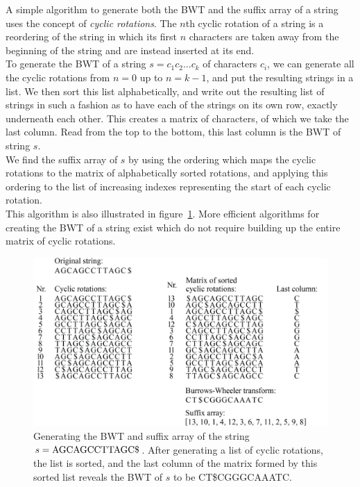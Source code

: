 \documentclass[a4paper,12pt,twoside,BCOR=10mm]{scrbook}
\begin{document}
A simple algorithm to generate both the BWT and the suffix array of a string uses
the concept of \textit{cyclic rotations}.
The $ n $th cyclic rotation of a string is a reordering of the string in which its first $ n $ characters
are taken away from the beginning of the string and are instead inserted at its end. \\
To generate the BWT of a string $ s = c_1 c_2 ... c_k $ of characters $ c_i $,
we can generate all the cyclic rotations from $ n = 0 $ up to $ n = k - 1 $, and
put the resulting strings in a list.
We then sort this list alphabetically, and write out the resulting list of strings
in such a fashion as to have each of the strings on its own row, exactly underneath each other.
This creates a matrix of characters, of which we take the last column.
Read from the top to the bottom, this last column is the BWT of string $ s $. \\
We find the suffix array of $ s $ by using the ordering which maps
the cyclic rotations to the matrix of alphabetically sorted rotations,
and applying this ordering to the list of increasing indexes representing
the start of each cyclic rotation. \\
This algorithm is also illustrated in figure~\ref{fig:evo_fig_bwt_with_cyclic_rotations}.
More efficient algorithms for creating the BWT of a string exist
which do not require building up the entire matrix of cyclic rotations.

\begin{figure}[!htb]
\centering
\includegraphics[width=\textwidth]{evo_fig_bwt_with_cyclic_rotations.png}
\caption[Generating the BWT and suffix array of a string]{Generating the BWT and suffix array of the string $ s = \textup{AGCAGCCTTAGC\$} $. After generating a list of cyclic rotations, the list is sorted, and the last column of the matrix formed by this sorted list reveals the BWT of $ s $ to be \textup{CT\$CGGGCAAATC}.} \label{fig:evo_fig_bwt_with_cyclic_rotations}
\end{figure}
\end{document}
